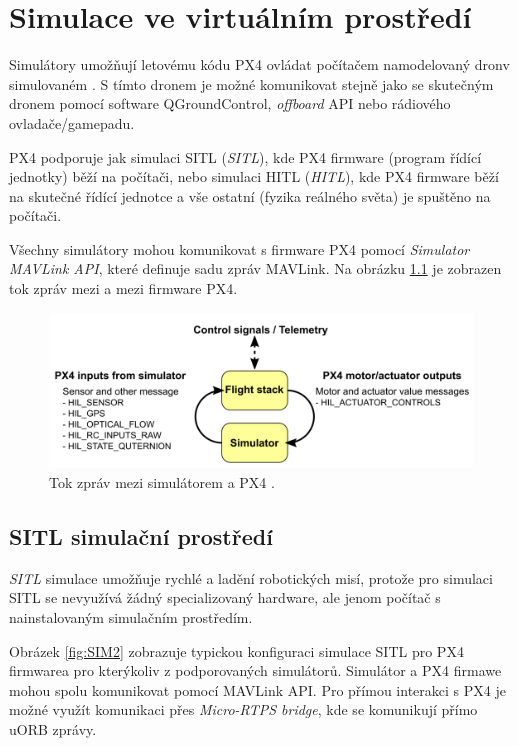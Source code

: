 \chapter{Simulace ve virtuálním prostředí}

Simulátory umožňují letovému kódu PX4 ovládat počítačem namodelovaný dron\break v simulovaném . S tímto dronem je možné komunikovat stejně jako se skutečným dronem pomocí software QGroundControl, \textit{offboard} API nebo rádiového ovladače/gamepadu. 

PX4 podporuje jak simulaci \acs{SITL} (\textit{\acl{SITL}}), kde PX4 firmware (program řídící jednotky) běží na počítači, nebo simulaci \acs{HITL} (\textit{\acl{HITL}}), kde PX4 firmware běží na skutečné řídící jednotce a vše ostatní (fyzika reálného světa) je spuštěno na počítači. \cite{PX4docs}

Všechny simulátory mohou komunikovat s firmware PX4 pomocí \textit{Simulator MAVLink API}, které definuje sadu zpráv MAVLink. Na obrázku \ref{fig:SIM1} je zobrazen tok zpráv mezi  a mezi firmware PX4.

\begin{figure}[!ht]
  \begin{center}
    \includegraphics[scale=0.3]{obrazky/SIM1}
  \end{center}
  \caption[Tok zpráv mezi simulátorem a PX4]{Tok zpráv mezi simulátorem a PX4 \cite{PX4docs}.}
  \label{fig:SIM1}
\end{figure}

\section{SITL simulační prostředí}

\textit{\acl{SITL}} simulace umožňuje rychlé a  ladění robotických misí, protože pro simulaci \acs{SITL} se nevyužívá žádný specializovaný hardware, ale jenom počítač s nainstalovaným simulačním prostředím.

Obrázek \ref{fig:SIM2} zobrazuje typickou konfiguraci simulace \acs{SITL} pro PX4 firmware\break a pro kterýkoliv z podporovaných simulátorů. Simulátor a PX4 firmawe mohou spolu komunikovat pomocí MAVLink \acs{API}. Pro přímou interakci s PX4 je možné využít komunikaci přes \textit{Micro-RTPS bridge}, kde se komunikují přímo uORB zprávy.

